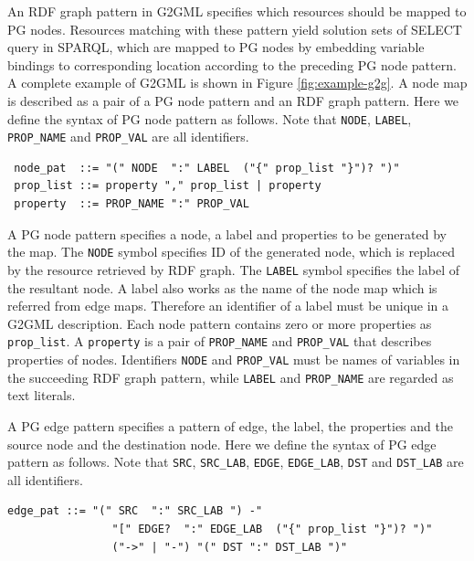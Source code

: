 \documentclass[runningheads]{llncs}
\begin{document}
An RDF graph pattern in G2GML specifies which resources should be mapped to PG nodes. Resources matching with these pattern yield solution sets of SELECT query in SPARQL, which 
 are mapped to PG nodes by embedding variable bindings to corresponding location according to the preceding PG node pattern.
A complete example of G2GML is shown in Figure \ref{fig:example-g2g}.
A node map is described as a pair of a PG node pattern  and an RDF graph pattern. Here we define the syntax of PG node pattern as follows. Note that \texttt{NODE}, \texttt{LABEL}, \texttt{PROP\_NAME} and \texttt{PROP\_VAL} are all identifiers.
\begin{defi}
\leavevmode
\begin{verbatim}
 node_pat  ::= "(" NODE  ":" LABEL  ("{" prop_list "}")? ")"
 prop_list ::= property "," prop_list | property
 property  ::= PROP_NAME ":" PROP_VAL
\end{verbatim}
\end{defi}

A PG node pattern specifies a node, a label and properties to be generated by the map. The \texttt{NODE} symbol specifies ID of the generated node, which is replaced by the resource retrieved by RDF graph. The \texttt{LABEL} symbol specifies the label of the resultant node. A label also works as the name of the node map which is referred from edge maps.
Therefore an identifier of a label must be unique in a G2GML description.
Each node pattern contains zero or more properties as \texttt{prop\_list}.
A \texttt{property} is a pair of \texttt{PROP\_NAME} and \texttt{PROP\_VAL} that describes properties of nodes.
Identifiers \texttt{NODE} and \texttt{PROP\_VAL} must be names of variables in the succeeding RDF graph pattern, while \texttt{LABEL} and \texttt{PROP\_NAME} are regarded as text literals.
 
A PG edge pattern specifies a pattern of edge, the label, the properties and the source node and the destination node.
Here we define the syntax of PG edge pattern as follows.
Note that \texttt{SRC}, \texttt{SRC\_LAB}, \texttt{EDGE}, \texttt{EDGE\_LAB}, \texttt{DST} and \texttt{DST\_LAB} are all identifiers.
\begin{defi}
\leavevmode
\begin{verbatim}
edge_pat ::= "(" SRC  ":" SRC_LAB ") -" 
                "[" EDGE?  ":" EDGE_LAB  ("{" prop_list "}")? ")" 
                ("->" | "-") "(" DST ":" DST_LAB ")"
\end{verbatim}
\end{defi}
\end{document}
